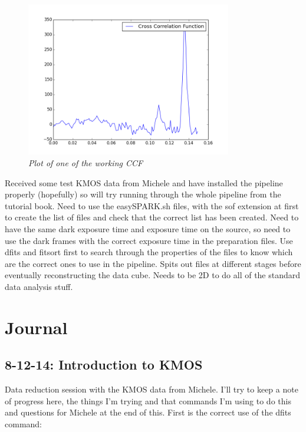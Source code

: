 \documentclass{literature}
\begin{document}
\begin{figure}[!htp]
\centering
\includegraphics[width=0.8\textwidth]{Cross_corr.png}
\caption{\footnotesize{\emph{Plot of one of the working CCF}}}
\label{fig:cross_cor}
\end{figure}

Received some test KMOS data from Michele and have installed the pipeline properly (hopefully) so will try running through the whole pipeline from the tutorial book. Need to use the easySPARK.sh files, with the sof extension at first to create the list of files and check that the correct list has been created. Need to have the same dark exposure time and exposure time on the source, so need to use the dark frames with the correct exposure time in the preparation files. Use dfits and fitsort first to search through the properties of the files to know which are the correct ones to use in the pipeline. Spits out files at different stages before eventually reconstructing the data cube. Needs to be 2D to do all of the standard data analysis stuff.




\section{Journal}
\subsection{8-12-14: Introduction to KMOS}
Data reduction session with the KMOS data from Michele. I'll try to keep a note of progress here, the things I'm trying and that commands I'm using to do this and questions for Michele at the end of this. First is the correct use of the dfits command: \\
\end{document}
